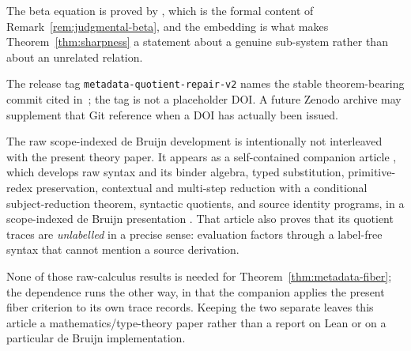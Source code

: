 \documentclass[10pt,reqno]{amsart}
\begin{document}
\endgroup
The beta equation  is proved by , which is the
formal content of Remark~\ref{rem:judgmental-beta}, and the embedding
 is what makes Theorem~\ref{thm:sharpness} a statement
about a genuine sub-system rather than about an unrelated relation.

The release tag \texttt{metadata-quotient-repair-v2} names the stable
theorem-bearing commit cited in~\cite{MetadataJSoftware2026}; the tag is not a
placeholder DOI.  A future Zenodo archive may supplement that Git reference
when a DOI has actually been issued.

The raw scope-indexed de Bruijn development is intentionally not interleaved
with the present theory paper.  It appears as a self-contained companion
article \cite{ScopedTraceCalculus2026}, which develops raw syntax and its
binder algebra, typed substitution, primitive-redex preservation, contextual
and multi-step reduction with a conditional subject-reduction theorem,
syntactic quotients, and source identity programs, in a scope-indexed
de Bruijn presentation \cite{deBruijn1972}.  That article also proves that its
quotient traces are \emph{unlabelled} in a precise sense: evaluation factors
through a label-free syntax that cannot mention a source derivation.

None of those raw-calculus results is needed for
Theorem~\ref{thm:metadata-fiber}; the dependence runs the other way, in that
the companion applies the present fiber criterion to its own trace records.
Keeping the two separate leaves this article a mathematics/type-theory paper
rather than a report on Lean or on a particular de Bruijn implementation.
\begingroup
\small


\endgroup
\end{document}
